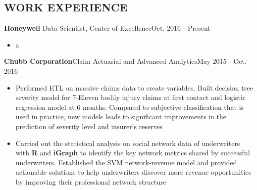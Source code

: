 \documentclass[10.5pt]{res} %
\begin{document}
\begin{resume}
\section{WORK EXPERIENCE} \parskip 11pt
				\textbf{Honeywell} \qquad Data Scientist, Center of Excellence\hfill Oct. 2016 - Present
				\begin{itemize}
					\item a
				\end{itemize}
				\textbf{Chubb Corporation}\qquad Claim Actuarial and Advanced Analytics\hfill May 2015 - Oct. 2016
				\begin{itemize}
					\item Performed ETL on massive claims data to create variables. Built decision tree severity model for 7-Eleven bodily injury claims at first contact and logistic regression model at 6 months. Compared to subjective classification that is used in practice, new models leads to significant improvements in the prediction of severity level and insurer's reserves 
					\item  Carried out the statistical analysis 
					 on social network data of underwriters with \textbf{R} and \textbf{iGraph} to identify the key network metrics shared by successful underwriters. Established the SVM network-revenue model and provided actionable solutions to help underwriters discover more revenue opportunities by improving their professional network structure

\end{itemize}
\end{resume}
\end{document}
